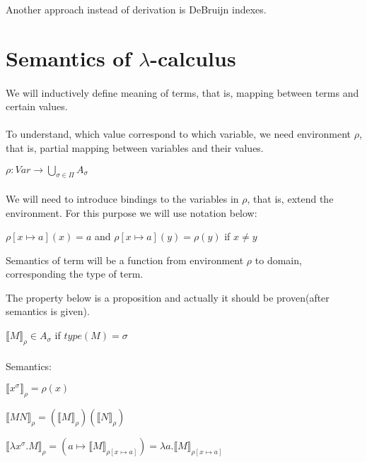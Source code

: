 \documentclass[a4paper,10pt]{book}
\newcommand{\sem}[2]{ \llbracket#1\rrbracket_{#2} }
\begin{document}
Another approach instead of derivation is DeBruijn indexes.

\section{Semantics of $\lambda$-calculus}
\paragraph{}

We will inductively define meaning of terms, that is, mapping between terms and certain values.

\paragraph{}

To understand, which value correspond to which variable, we need environment $ \rho $, that is, partial mapping between variables and their values.

$\rho : Var \rightarrow \bigcup_{\sigma \in \Pi} A_\sigma$

\paragraph{}
We will need to introduce bindings to the variables in $ \rho $, that is, extend the environment. For this purpose we will use notation below:

$\rho[x \mapsto a](x) = a$ and
$\rho[x \mapsto a](y) = \rho(y) $ if $x \neq y$

Semantics of term will be a function from environment $ \rho $ to domain, corresponding the type of term.

The property below is a proposition and actually it should be proven(after semantics is given).

$\sem{M}{\rho} \in A_\sigma$ if $ type(M) = \sigma $

\paragraph{}

Semantics:

$\sem{x^\sigma}{\rho} = \rho(x)$

$\sem{ MN }{\rho} = (\sem{ M }{\rho}) (\sem{N}{\rho})$

$\sem{\lambda x^\sigma . M}{\rho} = (a \mapsto \sem{M}{\rho[x \mapsto a]}) = \lambda a . \sem{M}{\rho[x \mapsto a]}$
\end{document}
